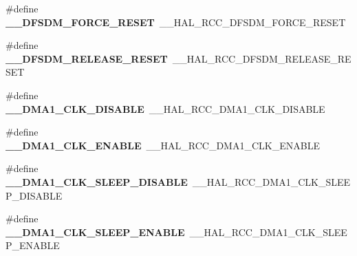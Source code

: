 \begin{DoxyCompactItemize}
\item 
\#define {\bfseries \+\_\+\+\_\+\+D\+F\+S\+D\+M\+\_\+\+F\+O\+R\+C\+E\+\_\+\+R\+E\+S\+ET}~\+\_\+\+\_\+\+H\+A\+L\+\_\+\+R\+C\+C\+\_\+\+D\+F\+S\+D\+M\+\_\+\+F\+O\+R\+C\+E\+\_\+\+R\+E\+S\+ET\hypertarget{group___h_a_l___r_c_c___aliased_gadd88a8e0907c4d62b6582adfd75e2c6f}{}\label{group___h_a_l___r_c_c___aliased_gadd88a8e0907c4d62b6582adfd75e2c6f}

\item 
\#define {\bfseries \+\_\+\+\_\+\+D\+F\+S\+D\+M\+\_\+\+R\+E\+L\+E\+A\+S\+E\+\_\+\+R\+E\+S\+ET}~\+\_\+\+\_\+\+H\+A\+L\+\_\+\+R\+C\+C\+\_\+\+D\+F\+S\+D\+M\+\_\+\+R\+E\+L\+E\+A\+S\+E\+\_\+\+R\+E\+S\+ET\hypertarget{group___h_a_l___r_c_c___aliased_gaf9a8039a705ed8210b2bedc0c0edc91e}{}\label{group___h_a_l___r_c_c___aliased_gaf9a8039a705ed8210b2bedc0c0edc91e}

\item 
\#define {\bfseries \+\_\+\+\_\+\+D\+M\+A1\+\_\+\+C\+L\+K\+\_\+\+D\+I\+S\+A\+B\+LE}~\+\_\+\+\_\+\+H\+A\+L\+\_\+\+R\+C\+C\+\_\+\+D\+M\+A1\+\_\+\+C\+L\+K\+\_\+\+D\+I\+S\+A\+B\+LE\hypertarget{group___h_a_l___r_c_c___aliased_ga153f57f9b39b25f0e6cde82e6d84473d}{}\label{group___h_a_l___r_c_c___aliased_ga153f57f9b39b25f0e6cde82e6d84473d}

\item 
\#define {\bfseries \+\_\+\+\_\+\+D\+M\+A1\+\_\+\+C\+L\+K\+\_\+\+E\+N\+A\+B\+LE}~\+\_\+\+\_\+\+H\+A\+L\+\_\+\+R\+C\+C\+\_\+\+D\+M\+A1\+\_\+\+C\+L\+K\+\_\+\+E\+N\+A\+B\+LE\hypertarget{group___h_a_l___r_c_c___aliased_gab7bc4cf6efeb1ea610682993cea17995}{}\label{group___h_a_l___r_c_c___aliased_gab7bc4cf6efeb1ea610682993cea17995}

\item 
\#define {\bfseries \+\_\+\+\_\+\+D\+M\+A1\+\_\+\+C\+L\+K\+\_\+\+S\+L\+E\+E\+P\+\_\+\+D\+I\+S\+A\+B\+LE}~\+\_\+\+\_\+\+H\+A\+L\+\_\+\+R\+C\+C\+\_\+\+D\+M\+A1\+\_\+\+C\+L\+K\+\_\+\+S\+L\+E\+E\+P\+\_\+\+D\+I\+S\+A\+B\+LE\hypertarget{group___h_a_l___r_c_c___aliased_ga78df1bf8400fee8e98d8ba43312bdc5e}{}\label{group___h_a_l___r_c_c___aliased_ga78df1bf8400fee8e98d8ba43312bdc5e}

\item 
\#define {\bfseries \+\_\+\+\_\+\+D\+M\+A1\+\_\+\+C\+L\+K\+\_\+\+S\+L\+E\+E\+P\+\_\+\+E\+N\+A\+B\+LE}~\+\_\+\+\_\+\+H\+A\+L\+\_\+\+R\+C\+C\+\_\+\+D\+M\+A1\+\_\+\+C\+L\+K\+\_\+\+S\+L\+E\+E\+P\+\_\+\+E\+N\+A\+B\+LE\hypertarget{group___h_a_l___r_c_c___aliased_ga38e380cb1fa25bab0fe185f9dc8a1c03}{}\label{group___h_a_l___r_c_c___aliased_ga38e380cb1fa25bab0fe185f9dc8a1c03}


\end{DoxyCompactItemize}
